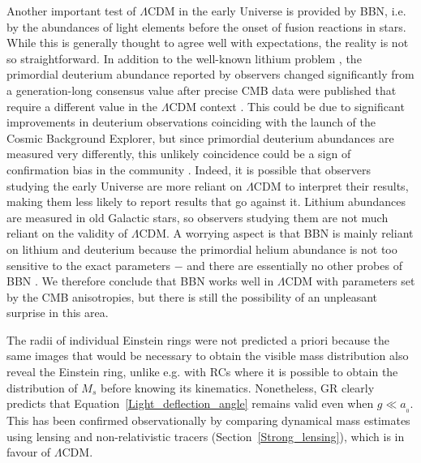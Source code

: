 \documentclass[fleqn,usenatbib,useAMS,onecolumn]{mnras} %
\begin{document}
Another important test of $\Lambda$CDM in the early Universe is provided by BBN, i.e. by the abundances of light elements before the onset of fusion reactions in stars. While this is generally thought to agree well with expectations, the reality is not so straightforward. In addition to the well-known lithium problem \citep{Fields_2011}, the primordial deuterium abundance reported by observers changed significantly from a generation-long consensus value after precise CMB data were published that require a different value in the $\Lambda$CDM context \citep[for a review of pre-CMB constraints, see][]{Tytler_2000}. This could be due to significant improvements in deuterium observations coinciding with the launch of the Cosmic Background Explorer, but since primordial deuterium abundances are measured very differently, this unlikely coincidence could be a sign of confirmation bias in the community \citep[see chapter~6 of][]{Merritt_2020}. Indeed, it is possible that observers studying the early Universe are more reliant on $\Lambda$CDM to interpret their results, making them less likely to report results that go against it. Lithium abundances are measured in old Galactic stars, so observers studying them are not much reliant on the validity of $\Lambda$CDM. A worrying aspect is that BBN is mainly reliant on lithium and deuterium because the primordial helium abundance is not too sensitive to the exact parameters $-$ and there are essentially no other probes of BBN \citep{Cyburt_2016}. We therefore conclude that BBN works well in $\Lambda$CDM with parameters set by the CMB anisotropies, but there is still the possibility of an unpleasant surprise in this area.

The radii of individual Einstein rings were not predicted a priori because the same images that would be necessary to obtain the visible mass distribution also reveal the Einstein ring, unlike e.g. with RCs where it is possible to obtain the distribution of $M_s$ before knowing its kinematics. Nonetheless, GR clearly predicts that Equation~\ref{Light_deflection_angle} remains valid even when $g \ll a_{_0}$. This has been confirmed observationally by comparing dynamical mass estimates using lensing and non-relativistic tracers (Section~\ref{Strong_lensing}), which is in favour of $\Lambda$CDM.
\end{document}
